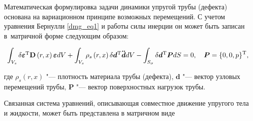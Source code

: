 Математическая формулировка задачи динамики упругой трубы (дефекта) основана на вариационном принципе возможных перемещений. С учетом уравнения Бернулли \eqref{dmg_eq1} и работы силы инерции он может быть записан в~матричной форме следующим образом:

\begin{equation}

\int _{V_s} {\delta {{\boldsymbol \varepsilon} ^{\mathop{\rm T}\nolimits} }{\bf{D}}\left( {r,x} \right){\boldsymbol \varepsilon} dV}  + \int _{V_s} {{\rho _s}\left( {r,x} \right)\delta {{\boldsymbol {d}}^{\mathop{\rm T}\nolimits} }{\bf{\ddot {\boldsymbol d}}}dV}  - \int _{S_\sigma} {\delta {{\boldsymbol {d}}^{\mathop{\rm T}\nolimits} }{\boldsymbol {P}}dS}  = 0,\quad {\boldsymbol {P}} = {\left\{ {0,0,p} \right\}^{\mathop{\rm T}\nolimits} },	

\end{equation}

где $\rho _s\left( {r,x} \right)$ "--- плотность материала трубы (дефекта), $\boldsymbol {d}$ "--- вектор узловых перемещений трубы, $\boldsymbol {P}$ "--- вектор поверхностных нагрузок трубы.



Связанная система уравнений, описывающая совместное движение упругого тела и жидкости, может быть представлена в матричном виде

